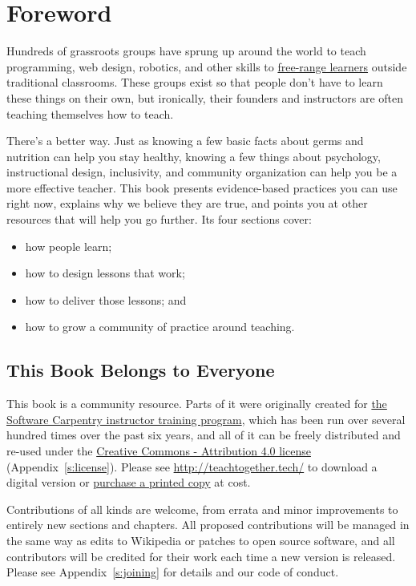\chapter*{Foreword}

Hundreds of grassroots groups have sprung up around the world to teach
programming, web design, robotics, and other skills to \protect\hyperlink{g:free-range-learner}{free-range
learners} outside traditional classrooms. These
groups exist so that people don't have to learn these things on their
own, but ironically, their founders and instructors are often teaching
themselves how to teach.

There's a better way. Just as knowing a few basic facts about germs
and nutrition can help you stay healthy, knowing a few things about
psychology, instructional design, inclusivity, and community
organization can help you be a more effective teacher. This book
presents evidence-based practices you can use right now, explains why
we believe they are true, and points you at other resources that will
help you go further. Its four sections cover:

\begin{itemize}
\tightlist
\item
  how people learn;
\item
  how to design lessons that work;
\item
  how to deliver those lessons; and
\item
  how to grow a community of practice around teaching.
\end{itemize}

\section{This Book Belongs to Everyone}\label{s:index-everyone}

This book is a community resource. Parts of it were originally
created for \href{http://carpentries.github.io/instructor-training/}{the Software Carpentry instructor training
program}, which has been run over several
hundred times over the past six years, and all of it can be freely
distributed and re-used under the \href{https://creativecommons.org/licenses/by/4.0/}{Creative Commons - Attribution 4.0
license} (Appendix~\ref{s:license}). Please see
\url{http://teachtogether.tech/} to download a digital version
or \href{http://www.lulu.com/commerce/index.php?fBuyContent=23123539}{purchase a printed copy} at cost.

Contributions of all kinds are welcome, from errata and minor
improvements to entirely new sections and chapters. All proposed
contributions will be managed in the same way as edits to Wikipedia
or patches to open source software, and all contributors will be
credited for their work each time a new version is released. Please
see Appendix~\ref{s:joining} for details and our code of conduct.
